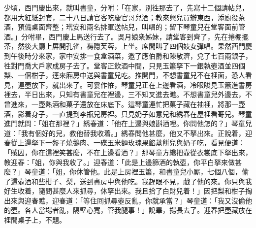 少頃，西門慶出來，就叫書童，分咐：「在家，別徃那去了，先寫十二個請帖兒，都用大紅紙封套，二十八日請官客吃慶官哥兒酒；教來興兒買辦東西，添廚役茶酒，預備桌面齊整；玳安和兩名排軍送帖兒，叫唱的；留下琴童兒在堂客面前管酒。」分咐畢，西門慶上馬送行去了。吳月娘衆姊妹，請堂客到齊了，先在捲棚擺茶，然後大廳上屏開孔雀，褥隱芙蓉，上坐。席間叫了四個妓女彈唱。果然西門慶到午後時分來家，家中安排一食盒酒菜，邀了應伯爵和陳敬濟，兌了七百兩銀子，徃對門喬大戶家成房子去了。堂客正飲酒中間，只見玉簫拏下一銀執壺酒並四個梨、一個柑子，逕來廂房中送與書童兒吃。推開門，不想書童兒不在裡面，恐人看見，連壺放下，就出來了。可霎作恠，琴童兒正在上邊看酒，冷眼睃見玉簫進書房裡去，半日出來，只知有書童兒在裡邊，三不知叉進去瞧。不想書童兒外邊去，不曾進來，一壺熱酒和菓子還放在床底下。這琴童連忙把菓子藏在袖裡，將那一壺酒，影着身子，一直提到李瓶兒房裡。只見奶子如意兒和綉春在屋裡看哥兒。琴童進門就問：「姐在那裡？」綉春道：「他在上邊與娘斟酒哩。你問他怎的？」琴童兒道：「我有個好的兒，教他替我收着。」綉春問他甚麼，他又不拏出來。正說着，迎春從上邊拏下一盤子燒鵝肉、一碟玉米麵玫瑰果餡蒸餅兒與奶子吃，看見便道：「賊囚，你在這裡笑甚麼，不在上邊看酒？」那琴童方纔把壺從衣裳底下拏出來，教迎春：「姐，你與我收了。」迎春道：「此是上邊篩酒的執壺，你平白拏來做甚麼？」琴童道：「姐，你休管他。此是上房裡玉簫，和書童兒小厮，七個八個，偷了這壺酒和些柑子、梨，送到書房中與他吃。我趕眼不見，戲了他的來。你只與我好生收着，隨問甚麼人來抓尋，休拏出來。我且拾了白財兒着！」因把梨和柑子掏出來與迎春瞧，迎春道：「等住囘抓尋壺反亂，你就承當？」琴童道：「我又沒偷他的壺。各人當場者亂，隔壁心寬，管我腿事！」說畢，揚長去了。迎春把壺藏放在裡間桌子上，不題。

